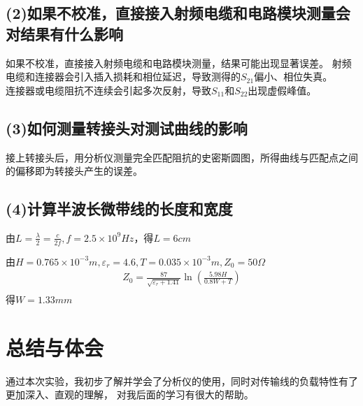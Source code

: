 \documentclass{zjureport}
\begin{document}
\subsection{(2)如果不校准，直接接入射频电缆和电路模块测量会对结果有什么影响}
如果不校准，直接接入射频电缆和电路模块测量，结果可能出现显著误差。
射频电缆和连接器会引入插入损耗和相位延迟，导致测得的$S_{21}$偏小、相位失真。\\
连接器或电缆阻抗不连续会引起多次反射，导致$S_{11}$和$S_{22}$出现虚假峰值。\\

\subsection{(3)如何测量转接头对测试曲线的影响}
接上转接头后，用分析仪测量完全匹配阻抗的史密斯圆图，所得曲线与匹配点之间的偏移即为转接头产生的误差。

\subsection{(4)计算半波长微带线的长度和宽度}
由$L = \frac{\lambda}{2} = \frac{c}{2f},f = 2.5\times 10^9 Hz$，得$L = 6 cm$\par
由$H = 0.765 \times 10^{-3}m,\varepsilon_r = 4.6,T = 0.035\times 10^{-3}m,Z_0 = 50\Omega$
\begin{align*}
  Z_0 = \frac{87}{\sqrt{\varepsilon_r + 1.41}} \ln \left( \frac{5.98H}{0.8W + T} \right) \\
\end{align*}
得$W = 1.33mm$

\section{总结与体会}
通过本次实验，我初步了解并学会了分析仪的使用，同时对传输线的负载特性有了更加深入、直观的理解，
对我后面的学习有很大的帮助。\\
\end{document}
